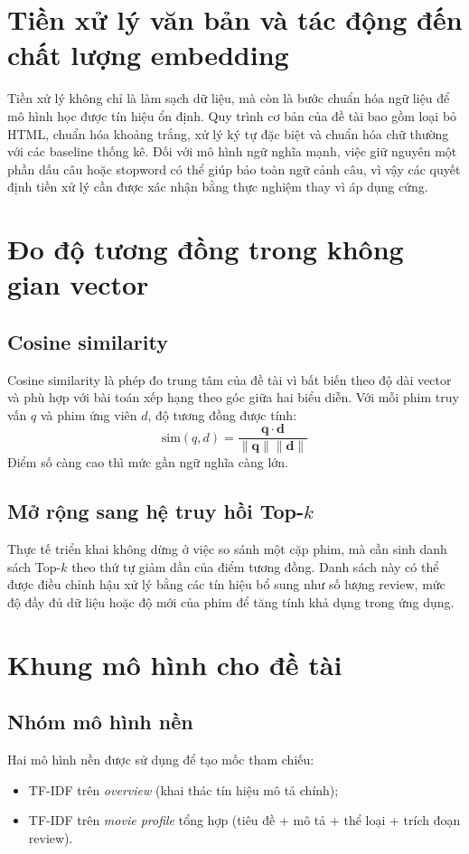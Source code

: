 \section{Tiền xử lý văn bản và tác động đến chất lượng embedding}
Tiền xử lý không chỉ là làm sạch dữ liệu, mà còn là bước chuẩn hóa ngữ liệu để mô hình học được tín hiệu ổn định. Quy trình cơ bản của đề tài bao gồm loại bỏ HTML, chuẩn hóa khoảng trắng, xử lý ký tự đặc biệt và chuẩn hóa chữ thường với các baseline thống kê. Đối với mô hình ngữ nghĩa mạnh, việc giữ nguyên một phần dấu câu hoặc stopword có thể giúp bảo toàn ngữ cảnh câu, vì vậy các quyết định tiền xử lý cần được xác nhận bằng thực nghiệm thay vì áp dụng cứng.

\section{Đo độ tương đồng trong không gian vector}
\subsection{Cosine similarity}
Cosine similarity là phép đo trung tâm của đề tài vì bất biến theo độ dài vector và phù hợp với bài toán xếp hạng theo góc giữa hai biểu diễn. Với mỗi phim truy vấn $q$ và phim ứng viên $d$, độ tương đồng được tính:
\[
\mathrm{sim}(q, d) = \frac{\mathbf{q}\cdot\mathbf{d}}{\lVert\mathbf{q}\rVert\lVert\mathbf{d}\rVert}
\]
Điểm số càng cao thì mức gần ngữ nghĩa càng lớn.

\subsection{Mở rộng sang hệ truy hồi Top-$k$}
Thực tế triển khai không dừng ở việc so sánh một cặp phim, mà cần sinh danh sách Top-$k$ theo thứ tự giảm dần của điểm tương đồng. Danh sách này có thể được điều chỉnh hậu xử lý bằng các tín hiệu bổ sung như số lượng review, mức độ đầy đủ dữ liệu hoặc độ mới của phim để tăng tính khả dụng trong ứng dụng.

\section{Khung mô hình cho đề tài}
\subsection{Nhóm mô hình nền}
Hai mô hình nền được sử dụng để tạo mốc tham chiếu:
\begin{itemize}
    \item TF-IDF trên \textit{overview} (khai thác tín hiệu mô tả chính);
    \item TF-IDF trên \textit{movie profile} tổng hợp (tiêu đề + mô tả + thể loại + trích đoạn review).
\end{itemize}

